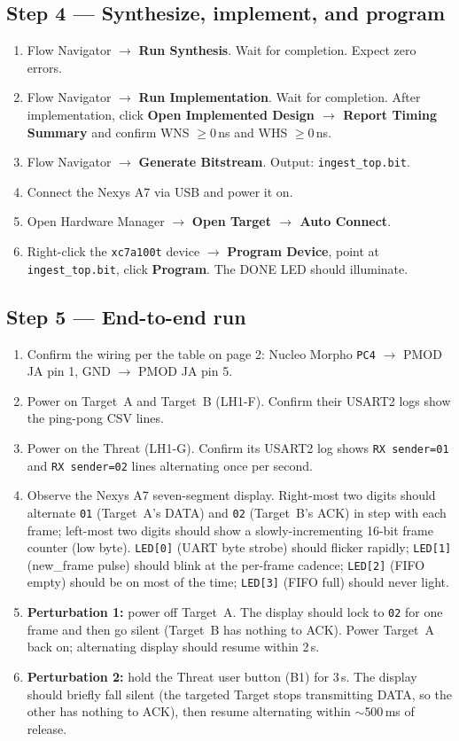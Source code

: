 \documentclass[11pt,letterpaper]{article}
\begin{document}
\newpage
\subsection{Step 4 --- Synthesize, implement, and program}

\begin{enumerate}[leftmargin=2em]
	\item Flow Navigator $\to$ \textbf{Run Synthesis}. Wait for completion. Expect zero errors.
	\item Flow Navigator $\to$ \textbf{Run Implementation}. Wait for completion. After implementation, click \textbf{Open Implemented Design $\to$ Report Timing Summary} and confirm WNS $\geq 0$\,ns and WHS $\geq 0$\,ns.
	\item Flow Navigator $\to$ \textbf{Generate Bitstream}. Output: \texttt{ingest\_top.bit}.
	\item Connect the Nexys A7 via USB and power it on.
	\item Open Hardware Manager $\to$ \textbf{Open Target $\to$ Auto Connect}.
	\item Right-click the \texttt{xc7a100t} device $\to$ \textbf{Program Device}, point at \texttt{ingest\_top.bit}, click \textbf{Program}. The DONE LED should illuminate.
\end{enumerate}

\newpage
\subsection{Step 5 --- End-to-end run}

\begin{enumerate}[leftmargin=2em]
	\item Confirm the wiring per the table on page 2: Nucleo Morpho \texttt{PC4} $\to$ PMOD JA pin 1, GND $\to$ PMOD JA pin 5.
	\item Power on Target~A and Target~B (LH1-F). Confirm their USART2 logs show the ping-pong CSV lines.
	\item Power on the Threat (LH1-G). Confirm its USART2 log shows \texttt{RX sender=01} and \texttt{RX sender=02} lines alternating once per second.
	\item Observe the Nexys A7 seven-segment display. Right-most two digits should alternate \texttt{01} (Target~A's DATA) and \texttt{02} (Target~B's ACK) in step with each frame; left-most two digits should show a slowly-incrementing 16-bit frame counter (low byte). \texttt{LED[0]} (UART byte strobe) should flicker rapidly; \texttt{LED[1]} (new\_frame pulse) should blink at the per-frame cadence; \texttt{LED[2]} (FIFO empty) should be on most of the time; \texttt{LED[3]} (FIFO full) should never light.
	\item \textbf{Perturbation 1:} power off Target~A. The display should lock to \texttt{02} for one frame and then go silent (Target~B has nothing to ACK). Power Target~A back on; alternating display should resume within 2\,s.
	\item \textbf{Perturbation 2:} hold the Threat user button (B1) for 3\,s. The display should briefly fall silent (the targeted Target stops transmitting DATA, so the other has nothing to ACK), then resume alternating within $\sim$500\,ms of release.
\end{enumerate}
\end{document}
